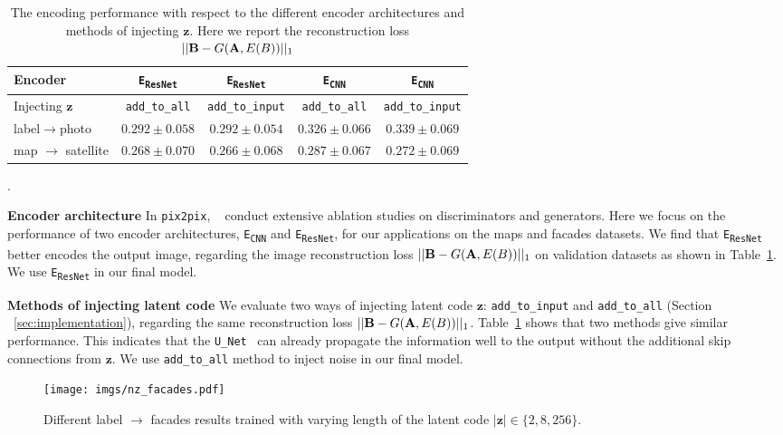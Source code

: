\documentclass{article}
\newcommand{\pp}{\texttt{pix2pix}\xspace}
\newcommand{\E}{E\xspace}
\newcommand{\A}{\mathbf{A}\xspace}
\newcommand{\B}{\mathbf{B}\xspace}
\newcommand{\z}{\mathbf{z}\xspace}
\begin{document}
\begin{table}
\begin{center}
 \begin{tabular}{l c c c c}
	Encoder & \texttt{E\textsubscript{ResNet}}  &  \texttt{E\textsubscript{ResNet}} &  \texttt{E\textsubscript{CNN}}  &  \texttt{E\textsubscript{CNN}} \\ \hline
	Injecting $\z$ & \texttt{add\_to\_all} &  \texttt{add\_to\_input} & \texttt{add\_to\_all} &  \texttt{add\_to\_input}\\ \hline
	label$\rightarrow$photo & $0.292 \pm 0.058$ & $0.292 \pm0.054$ & $0.326\pm 0.066$& $0.339\pm 0.069$ \\
	map $\rightarrow$ satellite &  $0.268 \pm 0.070$  & $0.266 \pm 0.068$ & $0.287 \pm 0.067$&$0.272\pm 0.069$\\
    \hline
	\end{tabular}
		\caption{The encoding performance with respect to the different encoder architectures and methods of injecting $\z$. Here we report the reconstruction loss $||\B - \G(\A,\E(B)) ||_1$}.
			\label{tab:rec}
	\end{center}
\vspace{-10mm}
\end{table}

{\bf Encoder architecture} In \pp, ~\citet{isola2016image} conduct extensive ablation studies on discriminators and generators. Here we focus on the performance of two encoder architectures, \texttt{E\textsubscript{CNN}} and \texttt{E\textsubscript{ResNet}}, for our applications on the maps and facades datasets. We find that \texttt{E\textsubscript{ResNet}} better encodes the output image, regarding the image reconstruction loss $||\B - \G(\A,\E(B)) ||_1$ on validation datasets as shown in Table~\ref{tab:rec}. We use \texttt{E\textsubscript{ResNet}} in our final model.

{\bf Methods of injecting latent code} We evaluate two ways of injecting latent code $\z$: \texttt{add\_to\_input} and \texttt{add\_to\_all} (Section ~\ref{sec:implementation}), regarding the same reconstruction loss $||\B - \G(\A,\E(B)) ||_1$. Table~\ref{tab:rec} shows that two methods give similar performance. This indicates that the \texttt{U\_Net}~\cite{ronneberger2015u} can already propagate the information well to the output without the additional skip connections from $\z$. We use \texttt{add\_to\_all} method to inject noise in our final model.

\begin{figure}
  \centering
  \texttt{[image: imgs/nz\_facades.pdf]}
\vspace{-4mm}
\caption{Different label $\rightarrow$ facades results trained with varying length of the latent code $|\z| \in \{2, 8, 256\}$. }
\label{fig:numberofz}
\vspace{-6mm}
\end{figure}
\end{document}
